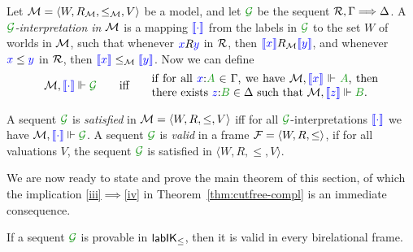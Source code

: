\documentclass[a4paper]{article}
\begin{document}
\begin{definition}\label{def:force-seq}
	Let $\mathcal{M} = \langle W, R_{\mathcal{M}}, \le_{\mathcal{M}}, V \rangle$ be a model, and let
	$\SG$ be the sequent $\mathcal{R} , \Gamma \Longrightarrow \Delta$. 
	A \emph{$\SG$-interpretation
		in $\mathcal{M}$} is a mapping ${\color{blue}{\llbracket \cdot\rrbracket}}$ from the labels in $\SG$ to the set $W$ of worlds in $\mathcal{M}$, such that whenever ${\color{blue}{x}}R{\color{blue}{y}}$ in $\mathcal{R}$, then ${\color{blue}{\llbracket x\rrbracket}}R_{\mathcal{M}}{\color{blue}{\llbracket y\rrbracket}}$, and whenever ${\color{blue}{x}}\le{{\color{blue}{y}}}$ in $\mathcal{R}$, then ${\color{blue}{\llbracket x\rrbracket}}\le_{\mathcal{M}}{\color{blue}{\llbracket y\rrbracket}}$. Now we can define 
	\begin{equation}
	\M,\inter\cdot\Vdash\SG\qquad\mbox{iff}\qquad
	\parbox{20em}{if for all $\labels{x}{A} \in \Gamma$, we have $\M, \inter x \Vdash \fm A$, then there exists $\labels{z}{B} \in \Delta$ such that $\M, \inter z \Vdash \fm B$.}
	\end{equation}
\end{definition}

\begin{definition}\label{def:valid-seq}
	A sequent $\SG$ is \emph{satisfied} in $\mathcal{M} = \langle W, R, \le, V
	\rangle$ iff for all $\SG$-interpretations ${\color{blue}{\llbracket \cdot\rrbracket}}$ we have
	$\M,\inter\cdot\Vdash\SG$.
	A sequent $\SG$ is \emph{valid} in a frame $\mathcal{F} = \langle W, R,
	\le \rangle$, if for all valuations $V$, the sequent $\SG$ is
	satisfied in $\langle W, R, \le, V \rangle$.
\end{definition}

We are now ready to state and prove the main theorem of this section, of which
the implication \ref{iii}$\implies$\ref{iv} in
Theorem~\ref{thm:cutfree-compl} is an immediate consequence.

\begin{theorem}\label{thm:soundness}
	If a sequent $\SG$ is provable in $\mathsf{lab}\mathsf{IK}_{\le}$, then it is valid in every birelational frame.
\end{theorem}
\end{document}
